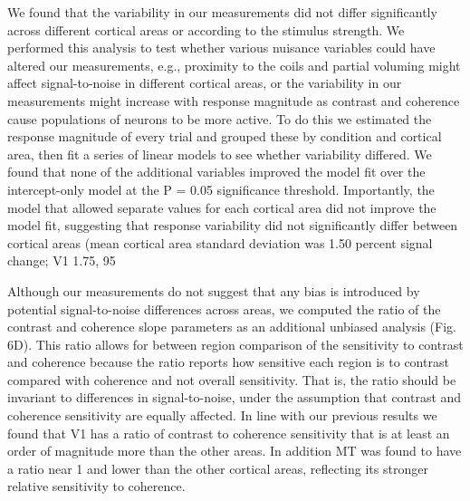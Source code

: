 \documentclass{report}
\begin{document}
We found that the variability in our measurements did not differ significantly across different cortical areas or according to the stimulus strength. We performed this analysis to test whether various nuisance variables could have altered our measurements, e.g., proximity to the coils and partial voluming might affect signal-to-noise in different cortical areas, or the variability in our measurements might increase with response magnitude as contrast and coherence cause populations of neurons to be more active. To do this we estimated the response magnitude of every trial and grouped these by condition and cortical area, then fit a series of linear models to see whether variability differed. We found that none of the additional variables improved the model fit over the intercept-only model at the P = 0.05 significance threshold. Importantly, the model that allowed separate values for each cortical area did not improve the model fit, suggesting that response variability did not significantly differ between cortical areas (mean cortical area standard deviation was 1.50 percent signal change; V1 1.75, 95%

Although our measurements do not suggest that any bias is introduced by potential signal-to-noise differences across areas, we computed the ratio of the contrast and coherence slope parameters as an additional unbiased analysis (Fig. 6D). This ratio allows for between region comparison of the sensitivity to contrast and coherence because the ratio reports how sensitive each region is to contrast compared with coherence and not overall sensitivity. That is, the ratio should be invariant to differences in signal-to-noise, under the assumption that contrast and coherence sensitivity are equally affected. In line with our previous results we found that V1 has a ratio of contrast to coherence sensitivity that is at least an order of magnitude more than the other areas. In addition MT was found to have a ratio near 1 and lower than the other cortical areas, reflecting its stronger relative sensitivity to coherence.
\end{document}
